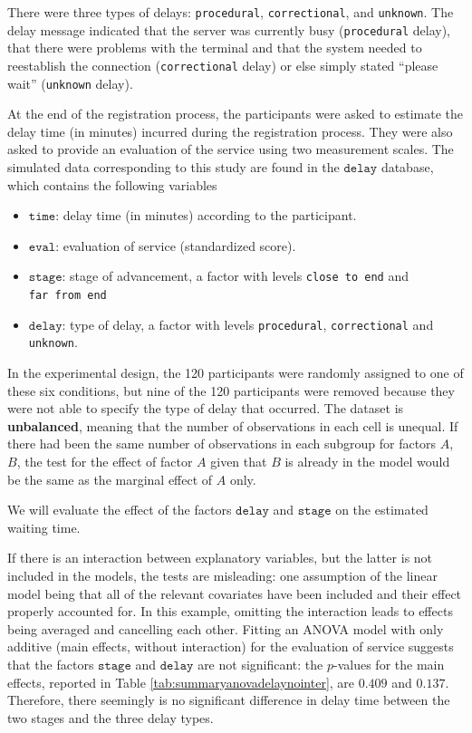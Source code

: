 \documentclass[
  11pt,
  letterpaper,
]{book}
\providecommand{\tightlist}{%
  \setlength{\itemsep}{0pt}\setlength{\parskip}{0pt}}
\theoremstyle{definition}
\theoremstyle{definition}
\theoremstyle{definition}
\theoremstyle{remark}
\begin{document}
There were three types of delays: \texttt{procedural}, \texttt{correctional}, and \texttt{unknown}. The delay message indicated that the server was currently busy (\texttt{procedural} delay), that there were problems with the terminal and that the system needed to reestablish the connection (\texttt{correctional} delay) or else simply stated ``please wait'' (\texttt{unknown} delay).

At the end of the registration process, the participants were asked to estimate the delay time (in minutes) incurred during the registration process. They were also asked to provide an evaluation of the service using two measurement scales. The simulated data corresponding to this study are found in the \(\texttt{delay}\) database, which contains the following variables

\begin{itemize}
\tightlist
\item
  \(\texttt{time}\): delay time (in minutes) according to the participant.
\item
  \(\texttt{eval}\): evaluation of service (standardized score).
\item
  \(\texttt{stage}\): stage of advancement, a factor with levels \texttt{close\ to\ end} and \texttt{far\ from\ end}
\item
  \(\texttt{delay}\): type of delay, a factor with levels \texttt{procedural}, \texttt{correctional} and \texttt{unknown}.
\end{itemize}

In the experimental design, the 120 participants were randomly assigned to one of these six conditions, but nine of the 120 participants were removed because they were not able to specify the type of delay that occurred. The dataset is \textbf{unbalanced}, meaning that the number of observations in each cell is unequal. If there had been the same number of observations in each subgroup for factors \(A\), \(B\), the test for the effect of factor \(A\) given that \(B\) is already in the model would be the same as the marginal effect of \(A\) only.

We will evaluate the effect of the factors \(\texttt{delay}\) and \(\texttt{stage}\) on the estimated waiting time.

If there is an interaction between explanatory variables, but the latter is not included in the models, the tests are misleading: one assumption of the linear model being that all of the relevant covariates have been included and their effect properly accounted for. In this example, omitting the interaction leads to effects being averaged and cancelling each other. Fitting an ANOVA model with only additive (main effects, without interaction) for the evaluation of service suggests that the factors \(\texttt{stage}\) and \(\texttt{delay}\) are not significant: the \(p\)-values for the main effects, reported in Table \ref{tab:summaryanovadelaynointer}, are \(0.409\) and \(0.137\). Therefore, there seemingly is no significant difference in delay time between the two stages and the three delay types.
\end{document}

